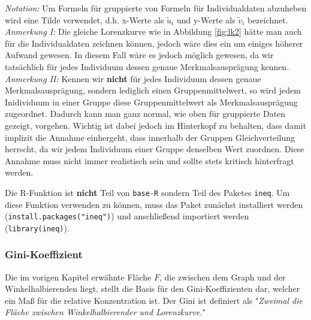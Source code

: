 \documentclass[a4paper]{article}
\newcommand\dangersign{%
 \makebox[1.8em][c]{%
 \makebox[0pt][c]{\raisebox{.15em}{\small!}}%
 \makebox[0pt][c]{\color{red}\Large$\triangle$}}}%
\begin{document}
\noindent \dangersign \textit{Notation:} Um Formeln für gruppierte von Formeln für Individualdaten abzuheben wird eine Tilde verwendet, d.h. x-Werte als $\tilde u_i$ und y-Werte als $\tilde v_i$ bezeichnet.\\
\noindent \dangersign \textit{Anmerkung I:} Die gleiche Lorenzkurve wie in Abbildung \ref{fig:lk2} hätte man auch für die Individualdaten zeichnen können, jedoch wäre dies ein um einiges höherer Aufwand gewesen. In diesem Fall wäre es jedoch möglich gewesen, da wir tatsächlich für jedes Individuum dessen genaue Merkmalsausprägung kennen.\\
\noindent \dangersign \textit{Anmerkung II:} Kennen wir \textbf{nicht} für jedes Individuum dessen genaue Merkmalsausprägung, sondern lediglich einen Gruppenmittelwert, so wird jedem Inidividuum in einer Gruppe diese Gruppenmittelwert als Merkmalsausprägung zugeordnet. Dadurch kann man ganz normal, wie oben für gruppierte Daten gezeigt, vorgehen. Wichtig ist dabei jedoch im Hinterkopf zu behalten, dass damit implizit die Annahme einhergeht, dass innerhalb der Gruppen Gleichverteilung herrscht, da wir jedem Individuum einer Gruppe denselben Wert zuordnen. Diese Annahme muss nicht immer realistisch sein und sollte stets kritisch hinterfragt werden.\\

\noindent {}

\noindent \dangersign Die R-Funktion ist \textbf{nicht} Teil von \texttt{base-R} sondern Teil des Paketes \texttt{ineq}. Um diese Funktion verwenden zu können, muss das Paket zunächst installiert werden (\texttt{install.packages("ineq")}) und anschließend importiert werden (\texttt{library(ineq)}).

\clearpage

\subsubsection{Gini-Koeffizient}\label{sec:gini}
Die im vorigen Kapitel erwähnte Fläche $F$, die zwischen dem Graph und der Winkelhalbierenden liegt, stellt die Basis für den Gini-Koeffizienten dar, welcher ein Maß für die relative Konzentration ist. Der Gini ist definiert als "\textit{Zweimal die Fläche zwischen Winkelhalbierender und Lorenzkurve.}"\\
\end{document}
